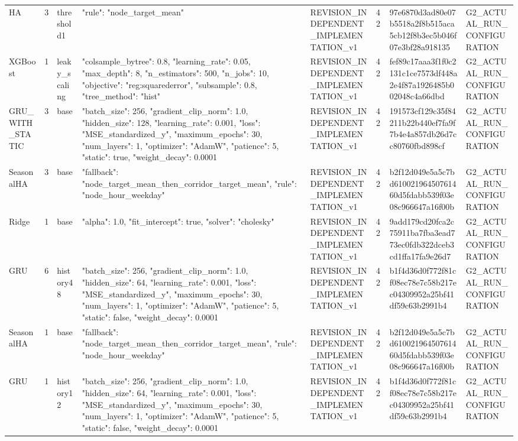 \begin{longtable}{llllllll}
HA & 3 & threshold1 & {"rule": "node\_target\_mean"} & REVISION\_INDEPENDENT\_IMPLEMENTATION\_v1 & 42 & 97e6870d3ad80e07b5518a2f8b515aca5cb12f8b3ec5b046f07e3bf28a918135 & G2\_ACTUAL\_RUN\_CONFIGURATION \\
XGBoost & 1 & leaky\_scaling & {"colsample\_bytree": 0.8, "learning\_rate": 0.05, "max\_depth": 8, "n\_estimators": 500, "n\_jobs": 10, "objective": "reg:squarederror", "subsample": 0.8, "tree\_method": "hist"} & REVISION\_INDEPENDENT\_IMPLEMENTATION\_v1 & 42 & fef89c17aaa3f1f0c2131c1ce7573df448a2e4f87a1926485b002048c4a66dbd & G2\_ACTUAL\_RUN\_CONFIGURATION \\
GRU\_WITH\_STATIC & 3 & base & {"batch\_size": 256, "gradient\_clip\_norm": 1.0, "hidden\_size": 128, "learning\_rate": 0.001, "loss": "MSE\_standardized\_y", "maximum\_epochs": 30, "num\_layers": 1, "optimizer": "AdamW", "patience": 5, "static": true, "weight\_decay": 0.0001} & REVISION\_INDEPENDENT\_IMPLEMENTATION\_v1 & 42 & 191573cf129c35f84211b22b440ef7fa9f7b4e4a857db26d7cc80760fbd898cf & G2\_ACTUAL\_RUN\_CONFIGURATION \\
SeasonalHA & 3 & base & {"fallback": "node\_target\_mean\_then\_corridor\_target\_mean", "rule": "node\_hour\_weekday"} & REVISION\_INDEPENDENT\_IMPLEMENTATION\_v1 & 42 & b2f12d049e5a5c7bd61002196450761460d5fdabb539f03e08c966647a16f00b & G2\_ACTUAL\_RUN\_CONFIGURATION \\
Ridge & 1 & base & {"alpha": 1.0, "fit\_intercept": true, "solver": "cholesky"} & REVISION\_INDEPENDENT\_IMPLEMENTATION\_v1 & 42 & 9add179cd20fca2c75911ba7fba3ead773ec0fdb322dceb3cd1ffa17fa9e26d7 & G2\_ACTUAL\_RUN\_CONFIGURATION \\
GRU & 6 & history48 & {"batch\_size": 256, "gradient\_clip\_norm": 1.0, "hidden\_size": 64, "learning\_rate": 0.001, "loss": "MSE\_standardized\_y", "maximum\_epochs": 30, "num\_layers": 1, "optimizer": "AdamW", "patience": 5, "static": false, "weight\_decay": 0.0001} & REVISION\_INDEPENDENT\_IMPLEMENTATION\_v1 & 42 & b1f4d36d0f772f81cf08ec78e7c58b217ec04309952a25bf41df59c63b2991b4 & G2\_ACTUAL\_RUN\_CONFIGURATION \\
SeasonalHA & 1 & base & {"fallback": "node\_target\_mean\_then\_corridor\_target\_mean", "rule": "node\_hour\_weekday"} & REVISION\_INDEPENDENT\_IMPLEMENTATION\_v1 & 42 & b2f12d049e5a5c7bd61002196450761460d5fdabb539f03e08c966647a16f00b & G2\_ACTUAL\_RUN\_CONFIGURATION \\
GRU & 1 & history12 & {"batch\_size": 256, "gradient\_clip\_norm": 1.0, "hidden\_size": 64, "learning\_rate": 0.001, "loss": "MSE\_standardized\_y", "maximum\_epochs": 30, "num\_layers": 1, "optimizer": "AdamW", "patience": 5, "static": false, "weight\_decay": 0.0001} & REVISION\_INDEPENDENT\_IMPLEMENTATION\_v1 & 42 & b1f4d36d0f772f81cf08ec78e7c58b217ec04309952a25bf41df59c63b2991b4 & G2\_ACTUAL\_RUN\_CONFIGURATION \\

\end{longtable}
